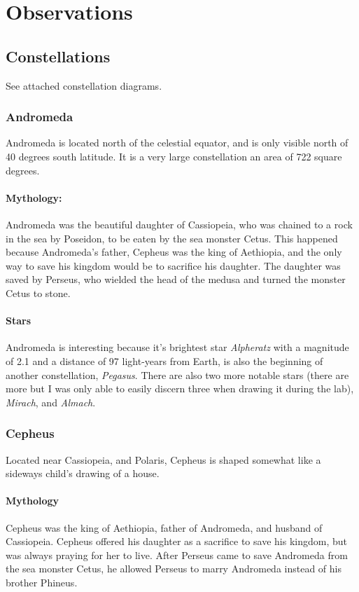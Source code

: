 \documentclass{article}
\begin{document}
\section{Observations}
\subsection{Constellations}
See attached constellation diagrams.

\subsubsection{Andromeda}
Andromeda is located north of the celestial equator, and is only visible north of 40 degrees south latitude. \cite{andromedastarmap} It is a very large constellation an area of 722 square degrees.
\paragraph{Mythology:}
Andromeda was the beautiful daughter of Cassiopeia, who was chained to a rock in the sea by Poseidon, to be eaten by the sea monster Cetus.  This happened because Andromeda's father, Cepheus was the king of Aethiopia, and the only way to save his kingdom would be to sacrifice his daughter.  The daughter was saved by Perseus, who wielded the head of the medusa and turned the monster Cetus to stone.
\paragraph{Stars}
Andromeda is interesting because it's brightest star \emph{Alpheratz} with a magnitude of 2.1 and a distance of 97 light-years from Earth, is also the beginning of another constellation, \emph{Pegasus}.  There are also two more notable stars (there are more but I was only able to easily discern three when drawing it during the lab), \emph{Mirach}, and \emph{Almach}.

\subsubsection{Cepheus}
Located near Cassiopeia, and Polaris, Cepheus is shaped somewhat like a sideways child's drawing of a house.
\paragraph{Mythology}
Cepheus was the king of Aethiopia, father of Andromeda, and husband of Cassiopeia.  Cepheus offered his daughter as a sacrifice to save his kingdom, but was always praying for her to live. After Perseus came to save Andromeda from the sea monster Cetus, he allowed Perseus to marry Andromeda instead of his brother Phineus. \cite{cepheusmyth}
\end{document}
